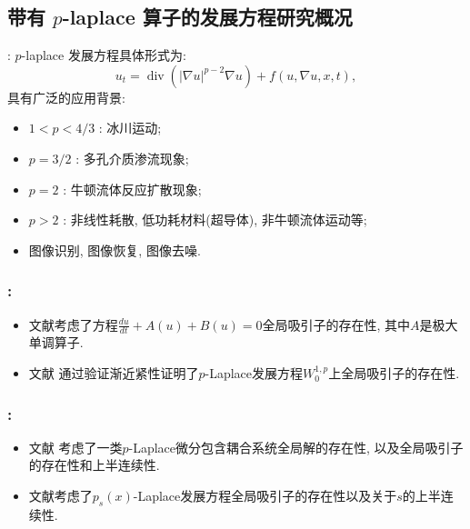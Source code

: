 \documentclass[UTF8]{ctexbeamer}
\newcommand*\abs[1]{\lvert#1\rvert}
\DeclareMathOperator{\Div}{div}
\begin{document}
\subsection{带有 \texorpdfstring{$p$}--laplace 算子的发展方程研究概况}
\begin{frame}{\secname : \subsecname}
    $p$-laplace 发展方程具体形式为:
    \begin{equation*}
        u_t = \Div(\abs{\nabla u}^{p-2}\nabla u) + f(u, \nabla u, x, t),
    \end{equation*}
    具有广泛的应用背景:
    \begin{itemize}
        \item $1 < p < 4/3$ : 冰川运动;
        \item $p = 3/2$ : 多孔介质渗流现象;
        \item $p = 2$ : 牛顿流体反应扩散现象;
        \item $p > 2$ : 非线性耗散, 低功耗材料(超导体), 非牛顿流体运动等;
        \item 图像识别, 图像恢复, 图像去噪.
    \end{itemize}
\end{frame}
\begin{frame}
    \frametitle{\secname : \subsecname}

    \begin{itemize}
        \item 文献考虑了方程$\frac{du}{dt}+A(u)+B(u)=0$全局吸引子的存在性, 其中$A$是极大单调算子.
        \item 文献 通过验证渐近紧性证明了$p$-Laplace发展方程$W_0^{1, p}$上全局吸引子的存在性.
    \end{itemize}

\end{frame}
\begin{frame}
    \frametitle{\secname : \subsecname}

    \begin{itemize}
        \item 文献 考虑了一类$p$-Laplace微分包含耦合系统全局解的存在性, 以及全局吸引子的存在性和上半连续性.
        \item 文献考虑了$p_s(x)$-Laplace发展方程全局吸引子的存在性以及关于$s$的上半连续性.
    \end{itemize}

\end{frame}
\end{document}
